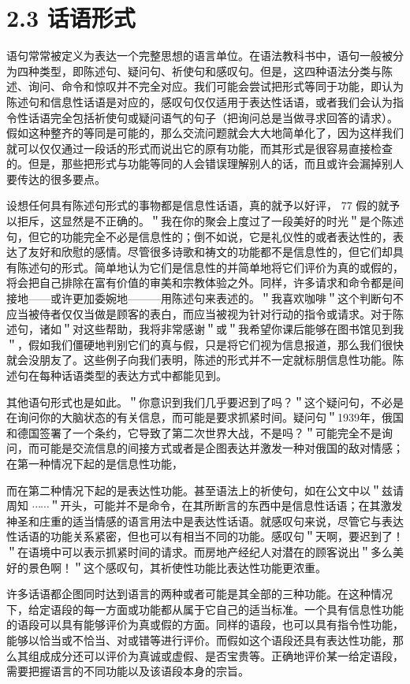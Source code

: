 \section*{2.3 话语形式}
语句常常被定义为表达一个完整思想的语言单位。在语法教科书中，语句一般被分为四种类型，即陈述句、疑问句、祈使句和感叹句。但是，这四种语法分类与陈述、询问、命令和惊叹并不完全对应。我们可能会尝试把形式等同于功能，即认为陈述句和信息性话语是对应的，感叹句仅仅适用于表达性话语，或者我们会认为指令性话语完全包括祈使句或疑问语气的句子（把询问总是当做寻求回答的请求）。假如这种整齐的等同是可能的，那么交流问题就会大大地简单化了，因为这样我们就可以仅仅通过一段话的形式而说出它的原有功能，而其形式是很容易直接检查的。但是，那些把形式与功能等同的人会错误理解别人的话，而且或许会漏掉别人要传达的很多要点。

设想任何具有陈述句形式的事物都是信息性话语，真的就予以好评， 77 假的就予以拒斥，这显然是不正确的。＂我在你的聚会上度过了一段美好的时光＂是个陈述句，但它的功能完全不必是信息性的；倒不如说，它是礼仪性的或者表达性的，表达了友好和欣慰的感情。尽管很多诗歌和祷文的功能都不是信息性的，但它们却具有陈述句的形式。简单地认为它们是信息性的并简单地将它们评价为真的或假的，将会把自己排除在富有价值的审美和宗教体验之外。同样，许多请求和命令都是间接地——或许更加委婉地———用陈述句来表述的。＂我喜欢咖啡＂这个判断句不应当被侍者仅仅当做是顾客的表白，而应当被视为针对行动的指令或请求。对于陈述句，诸如＂对这些帮助，我将非常感谢＂或＂我希望你课后能够在图书馆见到我＂，假如我们僵硬地判别它们的真与假，只是将它们视为信息报道，那么我们很快就会没朋友了。这些例子向我们表明，陈述的形式并不一定就标朋信息性功能。陈述句在每种话语类型的表达方式中都能见到。

其他语句形式也是如此。＂你意识到我们几乎要迟到了吗？＂这个疑问句，不必是在询问你的大脑状态的有关信息，而可能是要求抓紧时间。疑问句＂1939年，俄国和德国签署了一个条约，它导致了第二次世界大战，不是吗？＂可能完全不是询问，而可能是交流信息的间接方式或者是企图表达并激发一种对俄国的敌对情感；在第一种情况下起的是信息性功能，

而在第二种情况下起的是表达性功能。甚至语法上的祈使句，如在公文中以＂兹请周知 $\cdots \cdots$＂开头，可能并不是命令，在其所断言的东西中是信息性话语；在其激发神圣和庄重的适当情感的语言用法中是表达性话语。就感叹句来说，尽管它与表达性话语的功能关系紧密，但也可以有相当不同的功能。感叹句＂天啊，要迟到了！＂在语境中可以表示抓紧时间的请求。而房地产经纪人对潜在的顾客说出＂多么美好的景色啊！＂这个感叹句，其祈使性功能比表达性功能更浓重。

许多话语都企图同时达到语言的两种或者可能是其全部的三种功能。在这种情况下，给定语段的每一方面或功能都从属于它自己的适当标准。一个具有信息性功能的语段可以具有能够评价为真或假的方面。同样的语段，也可以具有指令性功能，能够以恰当或不恰当、对或错等进行评价。而假如这个语段还具有表达性功能，那么其组成成分还可以评价为真诚或虚假、是否宝贵等。正确地评价某一给定语段，需要把握语言的不同功能以及该语段本身的宗旨。

